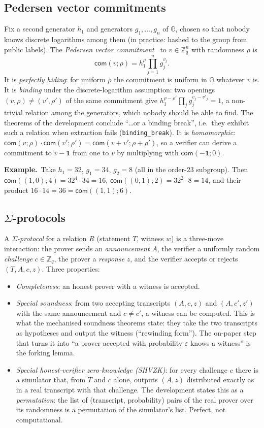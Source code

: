 \documentclass[11pt,a4paper]{article}
\newcommand{\G}{\mathbb{G}}
\newcommand{\Z}{\mathbb{Z}}
\newcommand{\com}{\mathsf{com}}
\newcommand{\rocq}[1]{\texttt{#1}}
\newcommand{\ex}[1]{\par\medskip\noindent\textbf{Example.}~#1\par\medskip}
\theoremstyle{remark}
\begin{document}
\subsection{Pedersen vector commitments}
Fix a second generator $h_1$ and generators $g_1, \ldots, g_n$ of $\G$,
chosen so that nobody knows discrete logarithms among them (in practice:
hashed to the group from public labels). The \emph{Pedersen vector
commitment}~\cite{pedersen} to $v \in \Z_q^n$ with randomness $\rho$ is
\[
  \com(v; \rho) = h_1^{\rho} \prod_{j=1}^{n} g_j^{v_j}.
\]
It is \emph{perfectly hiding}: for uniform $\rho$ the commitment is uniform
in $\G$ whatever $v$ is. It is \emph{binding} under the discrete-logarithm
assumption: two openings $(v, \rho) \ne (v', \rho')$ of the same commitment
give $h_1^{\rho - \rho'} \prod_j g_j^{v_j - v'_j} = 1$, a non-trivial
relation among the generators, which nobody should be able to find. The
theorems of the development conclude ``\ldots or a binding break'', i.e.\
they exhibit such a relation when extraction fails
(\rocq{binding\_break}). It is \emph{homomorphic}: $\com(v; \rho) \cdot
\com(v'; \rho') = \com(v + v'; \rho + \rho')$, so a verifier can derive a
commitment to $v - \mathbf{1}$ from one to $v$ by multiplying with
$\com(-\mathbf{1}; 0)$.

\ex{Take $h_1 = 32$, $g_1 = 34$, $g_2 = 8$ (all in the order-$23$
subgroup). Then $\com((1, 0); 4) = 32^4 \cdot 34 = 16$, $\com((0, 1); 2) =
32^2 \cdot 8 = 14$, and their product $16 \cdot 14 = 36 = \com((1, 1); 6)$.}

\subsection{$\Sigma$-protocols}\label{sec:sigma}
A \emph{$\Sigma$-protocol} for a relation $R$ (statement $T$, witness $w$)
is a three-move interaction: the prover sends an \emph{announcement} $A$,
the verifier a uniformly random \emph{challenge} $c \in \Z_q$, the prover a
\emph{response} $z$, and the verifier accepts or rejects $(T, A, c, z)$.
Three properties:
\begin{itemize}[nosep]
  \item \emph{Completeness}: an honest prover with a witness is accepted.
  \item \emph{Special soundness}: from two accepting transcripts $(A, c,
  z)$ and $(A, c', z')$ with the same announcement and $c \ne c'$, a
  witness can be computed. This is what the mechanised soundness theorems
  state: they take the two transcripts as hypotheses and output the
  witness (``rewinding form''). The on-paper step that turns it into ``a
  prover accepted with probability $\varepsilon$ knows a witness'' is the
  forking lemma.
  \item \emph{Special honest-verifier zero-knowledge (SHVZK)}: for every
  challenge $c$ there is a simulator that, from $T$ and $c$ alone, outputs
  $(A, z)$ distributed exactly as in a real transcript with that
  challenge. The development states this as a \emph{permutation}: the list
  of (transcript, probability) pairs of the real prover over its
  randomness is a permutation of the simulator's list. Perfect, not
  computational.
\end{itemize}
\end{document}
